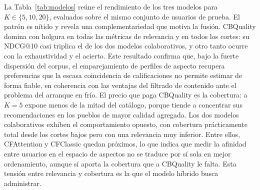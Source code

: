 La Tabla~\ref{tab:modelos} reúne el rendimiento de los tres modelos para
$K \in \{5, 10, 20\}$, evaluados sobre el mismo conjunto de usuarios de prueba. El patrón
es nítido y revela una complementariedad que motiva la fusión. CBQuality domina con
holgura en todas las métricas de relevancia y en todos los cortes: su NDCG@10 casi
triplica el de los dos modelos colaborativos, y otro tanto ocurre con la exhaustividad y
el acierto. Este resultado confirma que, bajo la fuerte dispersión del corpus, el
emparejamiento de perfiles de aspecto recupera preferencias que la escasa coincidencia de
calificaciones no permite estimar de forma fiable, en coherencia con las ventajas del
filtrado de contenido ante el problema del arranque en frío. El precio que paga CBQuality
es la cobertura: a $K=5$ expone menos de la mitad del catálogo, porque tiende a concentrar
sus recomendaciones en los pueblos de mayor calidad agregada. Los dos modelos
colaborativos exhiben el comportamiento opuesto, con cobertura prácticamente total desde
los cortes bajos pero con una relevancia muy inferior. Entre ellos, CFAttention y
CFClassic quedan próximos, lo que indica que medir la afinidad entre usuarios en el
espacio de aspectos no se traduce por sí sola en mejor ordenamiento, aunque sí aporta la
cobertura que a CBQuality le falta. Esta tensión entre relevancia y cobertura es la que el
modelo híbrido busca administrar.

